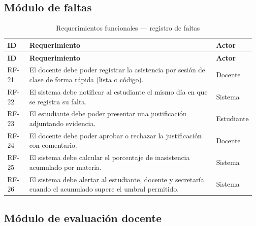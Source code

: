 \subsection{Módulo de faltas}

\begin{longtable}{@{}p{1.5cm} p{6.5cm} p{4.5cm}@{}}
\caption{Requerimientos funcionales --- registro de faltas}
\label{tab:rf-faltas}\\
\toprule
\rowcolor{azulClaro}
\textbf{ID} & \textbf{Requerimiento} & \textbf{Actor} \\
\midrule
\endfirsthead
\toprule
\rowcolor{azulClaro}
\textbf{ID} & \textbf{Requerimiento} & \textbf{Actor} \\
\midrule
\endhead
RF-21 & El docente debe poder registrar la asistencia por sesión de clase de forma rápida (lista o código). & Docente \\
RF-22 & El sistema debe notificar al estudiante el mismo día en que se registra su falta. & Sistema \\
RF-23 & El estudiante debe poder presentar una justificación adjuntando evidencia. & Estudiante \\
RF-24 & El docente debe poder aprobar o rechazar la justificación con comentario. & Docente \\
RF-25 & El sistema debe calcular el porcentaje de inasistencia acumulado por materia. & Sistema \\
RF-26 & El sistema debe alertar al estudiante, docente y secretaría cuando el acumulado supere el umbral permitido. & Sistema \\
\bottomrule
\end{longtable}

\subsection{Módulo de evaluación docente}

